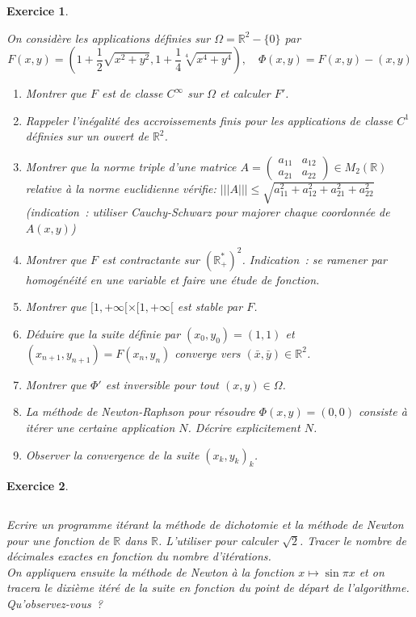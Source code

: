 \documentclass[10pt,a4paper]{article}
\newcommand{\R}{\mathbb R}
\newtheorem{exer}{Exercice}
\renewcommand{\le}{\leqslant}
\def\bexer{\begin{exer}\begin{em}}\def\eexer{\end{em}\end{exer}}
\begin{document}
\bexer
On consid\`ere les applications d\'efinies sur $\Omega=\R^2-\{0\}$ par 
$$ F(x,y)= (1+ \frac{1}{2}\sqrt{x^2+y^2},
1+\frac{1}{4}\sqrt[4]{x^4+y^4}), \quad
\Phi(x,y)= F(x,y)-(x,y)
$$
\begin{enumerate} 
\item Montrer que $F$ est de classe $C^{\infty}$ sur $\Omega$ et calculer $F'$.
\item Rappeler l'in\'egalit\'e des accroissements finis pour les applications de classe $C^1$ d\'efinies
sur un ouvert de $\R^2$. 
\item Montrer que la norme triple d'une matrice 
$A=\left( \begin{array}{cc} a_{11} & a_{12} \\ a_{21} & a_{22} \end{array}\right)\in M_2(\R)$ relative \`a la norme euclidienne v\'erifie:
$|||A ||| \le \sqrt{a_{11}^2+ a_{12}^2+ a_{21}^2 +a_{22}^2}$
(indication~: utiliser Cauchy-Schwarz pour majorer chaque coordonn\'ee
de $A(x,y)$)
\item Montrer que $F$ est contractante sur $(\R^*_+)^2$. Indication~:
se ramener par homog\'en\'eit\'e en une variable et faire une \'etude
de fonction.
\item Montrer que $[1,+\infty[ \times [1,+\infty[$ est stable par $F$.
\item D\'eduire que la suite d\'efinie par $(x_0,y_0)=(1,1)$ et $(x_{n+1},y_{n+1})=F(x_n,y_n)$ converge vers $(\bar x,\bar y)\in \R^2$. 
\item Montrer que $\Phi'$ est inversible pour tout  $(x,y)\in \Omega$. 
\item La m\'ethode de Newton-Raphson pour r\'esoudre $\Phi(x,y)=(0,0)$ consiste \`a it\'erer une certaine application $N$. D\'ecrire explicitement $N$.
\item Observer la convergence de la suite $(x_k,y_k)_k$. 
\end{enumerate}

\eexer




\bexer

$\ $

Ecrire un programme it\'erant la m\'ethode de dichotomie et la
m\'ethode de Newton pour une fonction de $\R$ dans $\R$. 
L'utiliser pour calculer $\sqrt 2$. Tracer le nombre de d\'ecimales exactes en fonction du nombre d'it\'erations.\\
On appliquera ensuite la m\'ethode de Newton \`a la fonction $x\mapsto
\sin \pi x$ et 
on tracera le dixi\`eme it\'er\'e de la suite en fonction du point de 
d\'epart de l'algorithme. Qu'observez-vous~?
\eexer
\end{document}
